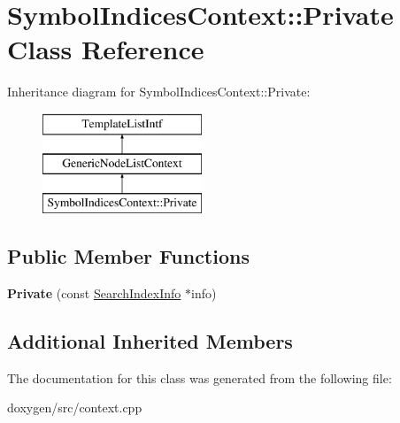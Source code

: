 \hypertarget{class_symbol_indices_context_1_1_private}{}\section{Symbol\+Indices\+Context\+::Private Class Reference}
\label{class_symbol_indices_context_1_1_private}
Inheritance diagram for Symbol\+Indices\+Context\+::Private\+:\begin{figure}[H]
\begin{center}
\leavevmode
\includegraphics[height=3.000000cm]{class_symbol_indices_context_1_1_private}
\end{center}
\end{figure}
\subsection*{Public Member Functions}
\begin{DoxyCompactItemize}
\item 
\mbox{\label{class_symbol_indices_context_1_1_private_ab7ddeddddd26670bda3985b8a26943ed}} 
{\bfseries Private} (const \mbox{\hyperlink{struct_search_index_info}{Search\+Index\+Info}} $\ast$info)
\end{DoxyCompactItemize}
\subsection*{Additional Inherited Members}


The documentation for this class was generated from the following file\+:\begin{DoxyCompactItemize}
\item 
doxygen/src/context.\+cpp\end{DoxyCompactItemize}
